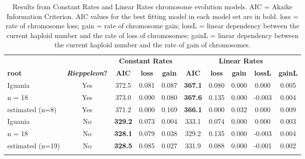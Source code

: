 \begin{longtable}{lccccccccc}

\caption{Results from Constant Rates and Linear Rates chromosome evolution models. AIC = Akaike Information Criterion. AIC values for the best fitting model in each model set are in bold. loss = rate of chromosome loss; gain = rate of chromosome gain; lossL = linear dependency between the current haploid number and the rate of loss of chromosomes; gainL = linear dependency between the current haploid number and the rate of gain of chromosomes.}\\ 
  
\hline
 &  & \multicolumn{3}{c}{\textbf{Constant Rates}} & \multicolumn{5}{c}{\textbf{Linear Rates}} \\
\textbf{root} & \textbf{\textit{Rieppeleon}?} & 
\textbf{AIC} & \textbf{loss} & \textbf{gain} & 
\textbf{AIC} & \textbf{loss} & \textbf{gain} & \textbf{lossL} & \textbf{gainL} \\
\hline
Iguania  &
Yes &
372.5 &
0.081 &
0.087 &
\textbf{367.1} &
0.080 &
0.000 &
0.000 &
0.005 \\
n = 18  &
Yes &
373.0 &
0.090 &
0.080 &
\textbf{367.6} &
0.135 &
0.000 &
-0.003 &
0.004 \\
estimated (n=8) &
Yes &
371.2 &
0.000 &
0.169 &
\textbf{366.1} &
0.000 &
0.032 &
0.000 &
0.009 \\
Iguania &
No &
\textbf{329.2} &
0.073 &
0.004 &
333.1 &
0.074 &
0.000 &
0.000 &
0.003 \\
n = 18 &
No &
\textbf{328.1} &
0.079 &
0.038 &
329.2 &
0.135 &
0.000 &
-0.003 &
0.004 \\
estimated (n=19) &
No &
\textbf{328.5} &
0.085 &
0.027 &
331.9 &
0.088 &
0.000 &
-0.001 &
0.002\\
\hline

\label{table-otus}
\end{longtable}